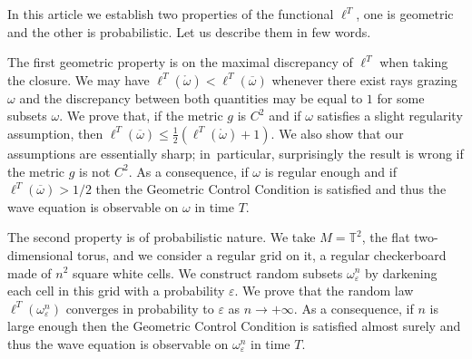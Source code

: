 \documentclass[JEP,XML,SOM,Unicode, NoEqCountersInSection,NoFloatCountersInSection,published]{cedram}
\theoremstyle{definition}
\begin{document}
In this article we establish two properties of the functional $\ell^T$, one is geometric and the other is probabilistic. Let us describe them in few words.

The first geometric property is on the maximal discrepancy of $\ell^T$ when taking the closure. We may have $\ell^T(\mathring{\omega})<\ell^T(\overline\omega)$ whenever there exist rays grazing $\omega$ and the discrepancy between both quantities may be equal to $1$ for some subsets $\omega$. We prove that, if the metric $g$ is $C^2$ and if $\omega$ satisfies a slight regularity assumption, then $\ell^T(\overline\omega) \leq \frac{1}{2} \left( \ell^T(\mathring{\omega}) + 1 \right)$.
We also show that our assumptions are essentially sharp; in~particular, surprisingly the result is wrong if the metric $g$ is not $C^2$.
As a consequence, if $\omega$ is regular enough and if $\ell^T(\overline\omega)>1/2$ then the Geometric Control Condition is satisfied and thus the wave equation is observable on $\omega$ in time $T$.

The second property is of probabilistic nature. We take $M=\mathbb{T}^2$, the flat two-dimensional torus, and we consider a regular grid on it, a regular checkerboard made of $n^2$ square white cells. We construct random subsets $\omega_\varepsilon^n$ by darkening each cell in this grid with a probability $\varepsilon$. We prove that the random law $\ell^T(\omega_\varepsilon^n)$ converges in probability to $\varepsilon$ as $n\rightarrow+\infty$.
As a consequence, if $n$ is large enough then the Geometric Control Condition is satisfied almost surely and thus the wave equation is observable on $\omega_\varepsilon^n$ in time $T$.
\end{document}
